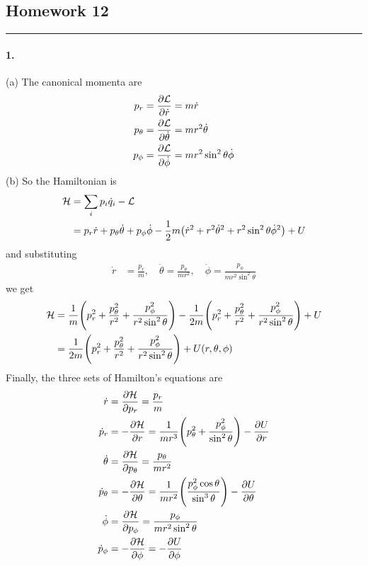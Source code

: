 \documentclass[../hw.tex]{subfiles}
\begin{document}
\setcounter{section}{12}
\begin{center}
  \section*{Homework 12} \label{sec:homework12}
\end{center}
\hrule \vspace{10px}
\paragraph*{1.} (a) The canonical momenta are
\begin{align*}
    p_r &= \pdv{\mathcal{L}}{\dot{r}} = m \dot r \\
    p_\theta &= \pdv{\mathcal{L}}{\dot{\theta}} = m r^2 \dot \theta \\
    p_\phi &= \pdv{\mathcal{L}}{\dot{\phi}} = m r^2 \sin^2 \theta \dot \phi
\end{align*}
(b) So the Hamiltonian is
\begin{align*}
    \mathcal{H} &= \sum_i p_i \dot q_i - \lagr \\
    &= p_r \dot r + p_\theta \dot \theta + p_\phi \dot \phi
         - \frac{1}{2}m \qt(\dot r^2 + r^2 \dot \theta^2 + r^2 \sin^2 \theta \dot \phi^2) + U
\end{align*}
and substituting
\begin{align*}
    \dot r &= \frac{p_r}{m}, \quad \dot \theta = \frac{p_\theta}{m r^2}, 
    \quad \dot \phi = \frac{p_\phi}{m r^2 \sin^2 \theta}
\end{align*}
we get
\begin{align*}
    \mathcal{H} &= \frac{1}{m} \qt(p_r^2 + \frac{p_\theta^2}{r^2} 
        + \frac{p_\phi^2}{r^2 \sin^2\theta}) 
        - \frac{1}{2m} \qt(p_r^2 + \frac{p_\theta^2}{r^2} + \frac{p_\phi^2}{r^2 \sin^2\theta}) + U \\
    &= \frac{1}{2m} \qt(p_r^2 + \frac{p_\theta^2}{r^2} + \frac{p_\phi^2}{r^2 \sin^2\theta}) + U(r, \theta, \phi)
\end{align*}
Finally, the three sets of Hamilton's equations are
\newcommand{\ham}{\mathcal{H}}
\begin{align*}
    \dot r &= \pdv{\ham}{p_r} = \frac{p_r}{m} \\ 
    \dot p_r &= -\pdv{\ham}{r} = \frac{1}{mr^3} \qt(p_\theta^2 + \frac{p_\phi^2}{\sin^2\theta}) - \pdv{U}{r} \\
    \dot \theta &= \pdv{\ham}{p_\theta} = \frac{p_\theta}{m r^2} \\
    \dot p_\theta &= -\pdv{\ham}{\theta} = \frac{1}{mr^2}\qt(\frac{p_\phi^2 \cos\theta}{\sin^3\theta}) - \pdv{U}{\theta} \\
    \dot \phi &= \pdv{\ham}{p_\phi} = \frac{p_\phi}{m r^2 \sin^2\theta} \\
    \dot p_\phi &= -\pdv{\ham}{\phi} = -\pdv{U}{\phi}
\end{align*}
\newpage
\end{document}
